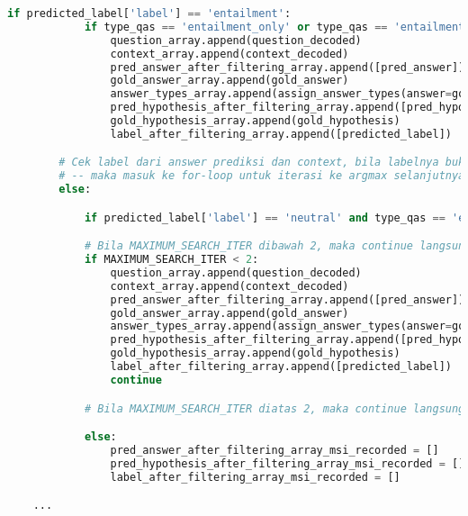 \begin{lstlisting}[language=Python, caption= Melakukan \emph{filtering} jawaban]
        if predicted_label['label'] == 'entailment':
            if type_qas == 'entailment_only' or type_qas == 'entailment_or_neutral':
                question_array.append(question_decoded)
                context_array.append(context_decoded)
                pred_answer_after_filtering_array.append([pred_answer])
                gold_answer_array.append(gold_answer)
                answer_types_array.append(assign_answer_types(answer=gold_answer))
                pred_hypothesis_after_filtering_array.append([pred_hypothesis])
                gold_hypothesis_array.append(gold_hypothesis)
                label_after_filtering_array.append([predicted_label])

        # Cek label dari answer prediksi dan context, bila labelnya bukan entailment (atau neutral), 
        # -- maka masuk ke for-loop untuk iterasi ke argmax selanjutnya, dengan menggunakan argsort
        else:

            if predicted_label['label'] == 'neutral' and type_qas == 'entailment_or_neutral': continue

            # Bila MAXIMUM_SEARCH_ITER dibawah 2, maka continue langsung
            if MAXIMUM_SEARCH_ITER < 2: 
                question_array.append(question_decoded)
                context_array.append(context_decoded)
                pred_answer_after_filtering_array.append([pred_answer])
                gold_answer_array.append(gold_answer)
                answer_types_array.append(assign_answer_types(answer=gold_answer))
                pred_hypothesis_after_filtering_array.append([pred_hypothesis])
                gold_hypothesis_array.append(gold_hypothesis)
                label_after_filtering_array.append([predicted_label])
                continue

            # Bila MAXIMUM_SEARCH_ITER diatas 2, maka continue langsung

            else:
                pred_answer_after_filtering_array_msi_recorded = []
                pred_hypothesis_after_filtering_array_msi_recorded = []
                label_after_filtering_array_msi_recorded = []

    ...
\end{lstlisting}

